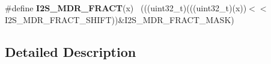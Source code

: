 \begin{DoxyCompactItemize}
\item 
\hypertarget{group___i2_s___register___masks_ga02b715e13475decb372a3bd2f52a5872}{}\#define {\bfseries I2\+S\+\_\+\+M\+D\+R\+\_\+\+F\+R\+A\+C\+T}(x)                                              ~(((uint32\+\_\+t)(((uint32\+\_\+t)(x))$<$$<$I2\+S\+\_\+\+M\+D\+R\+\_\+\+F\+R\+A\+C\+T\+\_\+\+S\+H\+I\+F\+T))\&I2\+S\+\_\+\+M\+D\+R\+\_\+\+F\+R\+A\+C\+T\+\_\+\+M\+A\+S\+K)\label{group___i2_s___register___masks_ga02b715e13475decb372a3bd2f52a5872}

\end{DoxyCompactItemize}


\subsection{Detailed Description}
